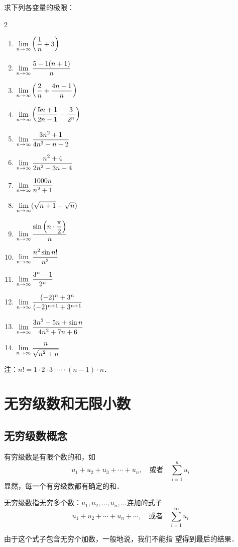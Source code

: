 求下列各变量的极限：
\begin{multicols}{2}
\begin{enumerate}
\item $\displaystyle\lim_{n\to\infty}\left(\dfrac{1}{n}+3\right)$
\item  $\displaystyle\lim_{n\to\infty} \dfrac{5-1(n+1)}{n}$ 
\item  $\displaystyle\lim_{n\to\infty}\left(\dfrac{2}{n}+\dfrac{4 n-1}{n}\right)$
\item  $\displaystyle\lim_{n\to\infty}\left(\dfrac{5 n+1}{2 n-1}-\dfrac{3}{2^{n}}\right)$
\item $\displaystyle\lim_{n\to\infty} \dfrac{3 n^{2}+1}{4 n^{3}-n-2} $
\item $\displaystyle\lim_{n\to\infty} \dfrac{n^{2}+4}{2 n^{2}-3 n-4}$
\item $ \displaystyle\lim_{n\to\infty} \dfrac{1000 n}{n^{2}+1}$
\item  $\displaystyle\lim_{n\to\infty}(\sqrt{n+1}-\sqrt{n})$
\item  $\displaystyle\lim_{n\to\infty} \dfrac{\sin \left(n \cdot \dfrac{\pi}{2}\right)}{n}$
\item  $\displaystyle\lim_{n\to\infty} \dfrac{n^{2} \sin n !}{n^{3}}$
\item  $\displaystyle\lim_{n\to\infty} \dfrac{3^{n}-1}{2^{n}}$
\item  $\displaystyle\lim_{n\to\infty} \dfrac{(-2)^{n}+3^{n}}{(-2)^{n+1}+3^{n+1}}$ 
\item  $\displaystyle\lim_{n\to\infty} \dfrac{3n^2-5n+\sin n}{4n^2+7n+6}$ 
\item  $\displaystyle\lim_{n\to\infty} \dfrac{n}{\sqrt{n^2+n}}$
\end{enumerate}
\end{multicols}

注：$n!=1\cdot 2\cdot 3\cdot \cdots \cdot (n-1)\cdot n$．

\section{无穷级数和无限小数}
\subsection{无穷级数概念}

有穷级数是有限个数的和，如
$$u_1+u_2+u_3+\cdots+u_n,\quad \text{或者}\quad \sum^n_{i=1}u_i$$
显然，每一个有穷级数都有确定的和．

无穷级数指无穷多个数：$u_1,u_2,\ldots,u_n,\ldots$连加的式子
$$u_1+u_2+\cdots+u_n+\cdots,\quad \text{或者}\quad \sum^{\infty}_{i=1}u_i$$

由于这个式子包含无穷个加数，一般地说，我们不能指
望得到最后的结果．

